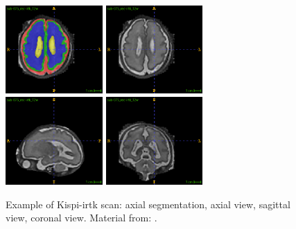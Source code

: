 \begin{figure}[hbtp]
    \vspace{-10pt}
    \centering
    \includegraphics[width=0.33\textwidth]{figures/irtk_ax_dseg.png}
    \hspace{5pt}
    \includegraphics[width=0.33\textwidth]{figures/irtk_ax.png} \\
    \vspace{10pt}
    \includegraphics[width=0.33\textwidth]{figures/irtk_sag.png}
    \hspace{5pt}
    \includegraphics[width=0.33\textwidth]{figures/irtk_cor.png}
    \caption{Example of Kispi-irtk scan: axial segmentation, axial view, sagittal view, coronal view. Material from: \cite{Payette2021, FeTA_MICCAI}.}
    \label{fig:kispi-irtk_images}
    \vspace{-10pt}
\end{figure}

